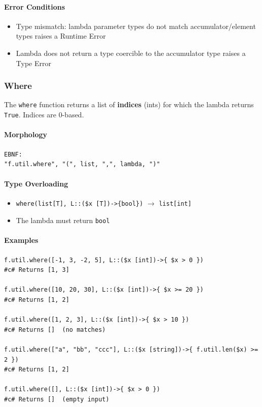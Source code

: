\paragraph{Error Conditions}
\begin{itemize}
\item Type mismatch: lambda parameter types do not match accumulator/element types raises a Runtime Error
\item Lambda does not return a type coercible to the accumulator type raises a Type Error
\end{itemize}

\subsubsection{Where}
The \texttt{where} function returns a list of \textbf{indices} (ints) for which the lambda returns \texttt{True}. Indices are 0-based.

\paragraph{Morphology}
\begin{verbatim}
EBNF:
"f.util.where", "(", list, ",", lambda, ")"
\end{verbatim}

\paragraph{Type Overloading}
\begin{itemize}
\item \texttt{where(list[T], L::(\$x [T])->\{bool\})} $\rightarrow$ \texttt{list[int]}
\item The lambda must return \texttt{bool}
\end{itemize}

\paragraph{Examples}
\begin{verbatim}
f.util.where([-1, 3, -2, 5], L::($x [int])->{ $x > 0 })
#c# Returns [1, 3]

f.util.where([10, 20, 30], L::($x [int])->{ $x >= 20 })
#c# Returns [1, 2]

f.util.where([1, 2, 3], L::($x [int])->{ $x > 10 })
#c# Returns []  (no matches)

f.util.where(["a", "bb", "ccc"], L::($x [string])->{ f.util.len($x) >= 2 })
#c# Returns [1, 2]

f.util.where([], L::($x [int])->{ $x > 0 })
#c# Returns []  (empty input)
\end{verbatim}

